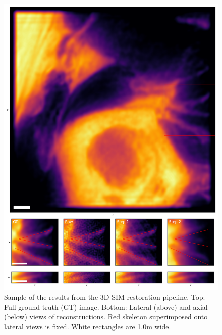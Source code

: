 \documentclass[12pt]{article}
\begin{document}
\begin{figure}[hbtp]
    \includegraphics[scale=0.55, center]{figures/vh_samples_prong.png}
    \caption{Sample of the results from the 3D SIM restoration pipeline.
    Top: Full ground-truth (GT) image. Bottom: Lateral (above) and axial (below) views of reconstructions.
    Red skeleton superimposed onto lateral views is fixed. White rectangles are 1.0\textmu m wide.}
    \label{fig:vh_samples_prong}
\end{figure}
\end{document}
